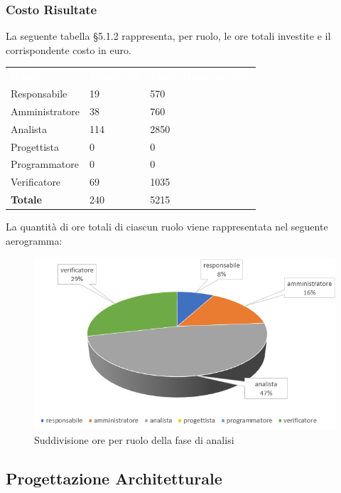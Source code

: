 \subsubsection{Costo Risultate}
La seguente tabella §5.1.2 rappresenta, per ruolo, le ore totali investite e il corrispondente costo in euro.
{
	\renewcommand{\arraystretch}{2}
	\centering
	\begin{longtable}{ C{3cm} C{2cm} C{4cm}}
		\textcolor{white}{\textbf{Ruolo}} & \textcolor{white}{\textbf{Totale ore}} & \textcolor{white}{\textbf{Costo Ruolo in euro}}\\	
        
        Responsabile & 19 & 570\\
        Amministratore & 38 & 760\\
        Analista & 114 & 2850 \\
        Progettista & 0 & 0 \\
        Programmatore & 0 & 0 \\
        Verificatore & 69 & 1035 \\
        \textbf{Totale} & 240 & 5215 \\
		
	\end{longtable}
}

La quantità di ore totali di ciascun ruolo viene rappresentata nel seguente aerogramma:

\begin{figure}[h]
	\centering
	\includegraphics[scale=2]{sezioni/Aerogrammi/AerogrammaAnalisi.png}
	\caption{Suddivisione ore per ruolo della fase di analisi}
\end{figure}

\subsection{Progettazione Architetturale}

